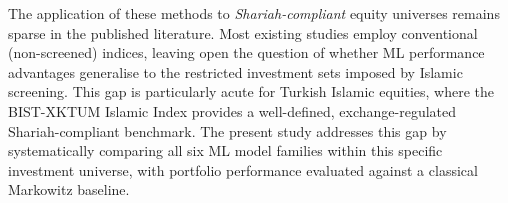 The application of these methods to \textit{Shariah-compliant} equity universes
remains sparse in the published literature. Most existing studies employ
conventional (non-screened) indices, leaving open the question of whether ML
performance advantages generalise to the restricted investment sets imposed by
Islamic screening. This gap is particularly acute for Turkish Islamic equities,
where the BIST-XKTUM Islamic Index provides a well-defined, exchange-regulated
Shariah-compliant benchmark. The present study addresses this gap by
systematically comparing all six ML model families within this specific
investment universe, with portfolio performance evaluated against a classical
Markowitz baseline.

